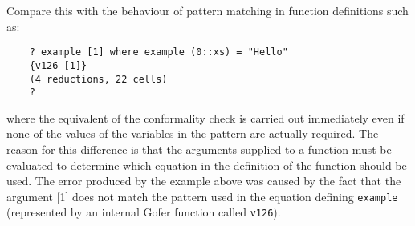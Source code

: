 Compare this  with  the  behaviour  of  pattern  matching  in  function
definitions such as:
\begin{verbatim}
    ? example [1] where example (0::xs) = "Hello"
    {v126 [1]}
    (4 reductions, 22 cells)
    ?
\end{verbatim}
where  the  equivalent  of  the  conformality  check  is  carried   out
immediately even if none of the values of the variables in the  pattern
are actually required.  The reason for  this  difference  is  that  the
arguments supplied to a function must be evaluated to  determine  which
equation in the definition of the function should be used.   The  error
produced by the example above was caused by the fact that the  argument
[1] does not match the pattern used in the equation defining  \verb"example"
(represented by an internal Gofer function called \verb"v126").

